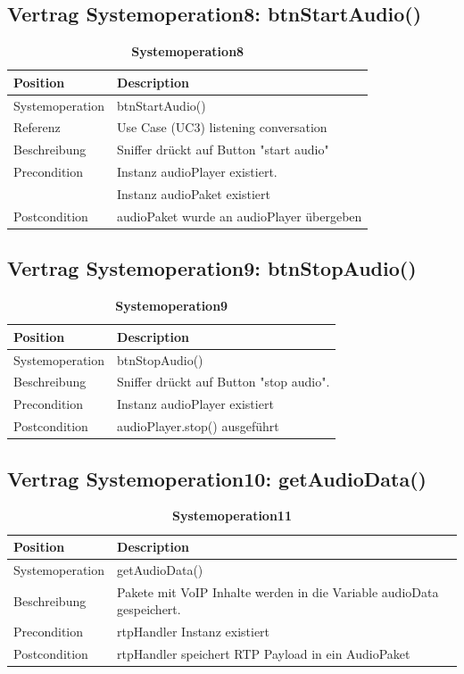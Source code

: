 \documentclass[a4,12pt]{scrartcl}
\begin{document}
\subsection{Vertrag Systemoperation8: btnStartAudio()}
\begin{table}[H]
\centering
    \begin{tabular}{@{} l l@{}}    
    {Position} & {Description}\\ \midrule
   	Systemoperation & btnStartAudio()\\ \addlinespace
   	Referenz & Use Case (UC3) listening conversation\\ \addlinespace
   	Beschreibung & Sniffer drückt auf Button "start audio"\\ \addlinespace
   	Precondition & Instanz audioPlayer existiert. \\ \addlinespace
   	& Instanz audioPaket existiert\\ \addlinespace 
	Postcondition & audioPaket wurde an audioPlayer übergeben\\ 
	\bottomrule
    \end{tabular}
\caption{\textbf{Systemoperation8}}
\end{table}
\subsection{Vertrag Systemoperation9: btnStopAudio()}
\begin{table}[H]
\centering
    \begin{tabular}{@{} l l@{}}    
    {Position} & {Description}\\ \midrule
   	Systemoperation &  btnStopAudio()\\ \addlinespace
   	Beschreibung & Sniffer drückt auf Button "stop audio".\\ \addlinespace
   	Precondition & Instanz audioPlayer existiert\\ \addlinespace
	Postcondition & audioPlayer.stop() ausgeführt\\ \bottomrule
    \end{tabular}
\caption{\textbf{Systemoperation9}}
\end{table}
\subsection{Vertrag Systemoperation10: getAudioData()}
\begin{table}[H] 
\centering
    \begin{tabular}{@{} l l@{}}    
    {Position} & {Description}\\ \midrule
   	Systemoperation & getAudioData()\\ \addlinespace
   	Beschreibung & Pakete mit VoIP Inhalte werden in die Variable audioData gespeichert.\\ \addlinespace
   	Precondition & rtpHandler Instanz existiert\\ \addlinespace
	Postcondition & rtpHandler speichert RTP Payload in ein AudioPaket\\ \bottomrule
    \end{tabular}
\caption{\textbf{Systemoperation11}}
\end{table}
\end{document}
